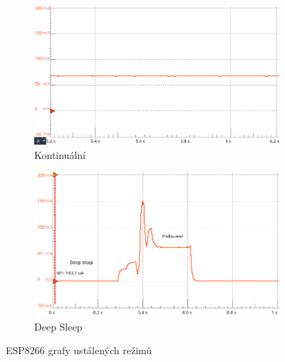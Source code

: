 \documentclass[a4paper, 12pt]{report}
\begin{document}
    \begin{figure}[h!]
        \centering
        \begin{subfigure}[b]{0.6\linewidth}
            \includegraphics[width=\linewidth]{images/ESP8266_on_waiting}
            \caption{Kontinuální}
        \end{subfigure}
        \begin{subfigure}[b]{0.6\linewidth}
            \includegraphics[width=\linewidth]{images/ESP8266_deepsleep_waiting}
            \caption{Deep Sleep}
        \end{subfigure}
        \caption{ESP8266 grafy ustálených režimů}
        \label{fig:esp8266_waiting}
    \end{figure}
\end{document}
